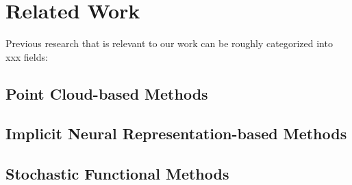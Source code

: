 \chapter{Related Work}\label{ch:related-work}
Previous research that is relevant to our work can be roughly categorized into xxx fields:



\section{Point Cloud-based Methods}\label{PCC-old}



\section{Implicit Neural Representation-based Methods}\label{INR-old}



\section{Stochastic Functional Methods}\label{Stoch-old}



